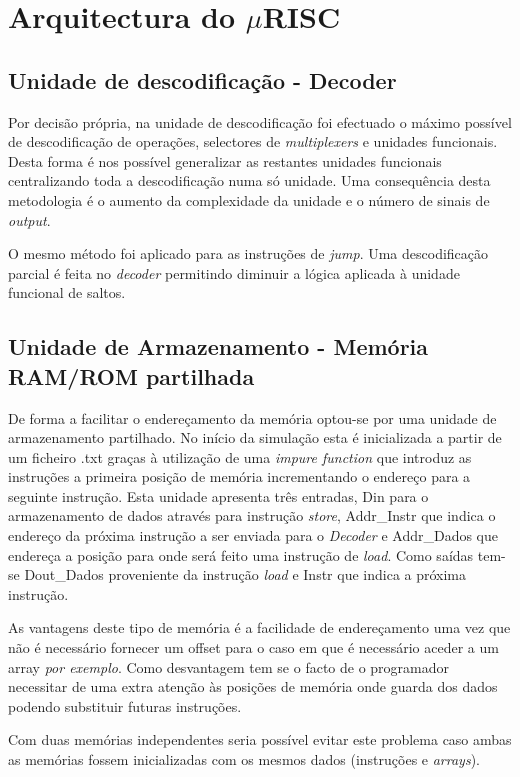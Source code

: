 \chapter{Arquitectura do $\mu$RISC}
\section{Unidade de descodificação - Decoder}

Por decisão própria, na unidade de descodificação foi efectuado o máximo possível de descodificação de operações, selectores de \textit{multiplexers} e unidades funcionais. Desta forma é nos possível generalizar as restantes unidades funcionais centralizando toda a descodificação numa só unidade. Uma consequência desta metodologia é o aumento da complexidade da unidade e o número de sinais de \textit{output}.\par O mesmo método foi aplicado para as instruções de \textit{jump}. Uma descodificação parcial é feita no \textit{decoder} permitindo diminuir a lógica aplicada à unidade funcional de saltos.


\section{Unidade de Armazenamento - Memória RAM/ROM partilhada}

De forma a facilitar o endereçamento da memória optou-se por uma unidade de armazenamento partilhado. No início da simulação esta é inicializada a partir de um ficheiro .txt graças à utilização de uma \textit{impure function} que introduz as instruções a primeira posição de memória incrementando o endereço para a seguinte instrução. 
Esta unidade apresenta três entradas, Din para o armazenamento de dados através para instrução \textit{store}, Addr\_Instr que indica o endereço da próxima instrução a ser enviada para o \textit{Decoder} e Addr\_Dados que endereça a posição para onde será feito uma instrução de \textit{load}.
Como saídas tem-se Dout\_Dados proveniente da instrução \textit{load} e Instr que indica a próxima instrução.

As vantagens deste tipo de memória é a facilidade de endereçamento uma vez que não é necessário fornecer um offset para o caso em que é necessário aceder a um array \textit{por exemplo}. Como desvantagem tem se o facto de o programador necessitar de uma extra atenção às posições de memória onde guarda dos dados podendo substituir futuras instruções.

Com duas memórias independentes seria possível evitar este problema caso ambas as memórias fossem inicializadas com os mesmos dados (instruções e \textit{arrays}).

